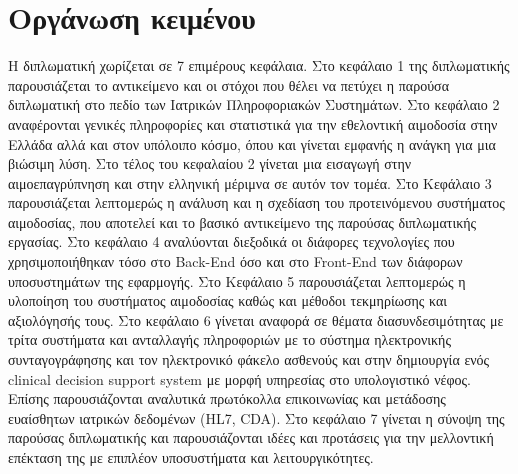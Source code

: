 \section{Οργάνωση κειμένου}
H διπλωματική χωρίζεται σε 7 επιμέρους κεφάλαια. Στο κεφάλαιο 1 της διπλωματικής παρουσιάζεται το αντικείμενο και οι στόχοι που θέλει να πετύχει η παρούσα διπλωματική στο πεδίο των Ιατρικών Πληροφοριακών Συστημάτων. Στο κεφάλαιο 2 αναφέρονται γενικές πληροφορίες και στατιστικά για την εθελοντική αιμοδοσία στην Ελλάδα αλλά και στον υπόλοιπο κόσμο, όπου και γίνεται εμφανής η ανάγκη για μια βιώσιμη λύση. Στο τέλος του κεφαλαίου 2 γίνεται μια εισαγωγή στην αιμοεπαγρύπνηση και στην ελληνική μέριμνα σε αυτόν τον τομέα. Στο Κεφάλαιο 3 παρουσιάζεται λεπτομερώς η ανάλυση και η σχεδίαση του προτεινόμενου συστήματος αιμοδοσίας, που αποτελεί και το βασικό αντικείμενο της παρούσας διπλωματικής εργασίας. Στο κεφάλαιο 4 αναλύονται διεξοδικά οι διάφορες τεχνολογίες που χρησιμοποιήθηκαν τόσο στο Back-End όσο και στο Front-End των διάφορων υποσυστημάτων της εφαρμογής. Στο Κεφάλαιο 5 παρουσιάζεται λεπτομερώς η υλοποίηση του συστήματος αιμοδοσίας καθώς και μέθοδοι τεκμηρίωσης και αξιολόγησής τους. Στο κεφάλαιο 6 γίνεται αναφορά σε θέματα διασυνδεσιμότητας με τρίτα συστήματα και ανταλλαγής πληροφοριών με το σύστημα ηλεκτρονικής συνταγογράφησης και τον ηλεκτρονικό φάκελο ασθενούς και στην δημιουργία ενός clinical decision support system με μορφή υπηρεσίας στο υπολογιστικό νέφος. Επίσης παρουσιάζονται αναλυτικά πρωτόκολλα επικοινωνίας και μετάδοσης ευαίσθητων ιατρικών δεδομένων (HL7, CDA). Στο κεφάλαιο 7 γίνεται η σύνοψη της παρούσας διπλωματικής και παρουσιάζονται ιδέες και προτάσεις για την μελλοντική επέκταση της με επιπλέον υποσυστήματα και λειτουργικότητες.